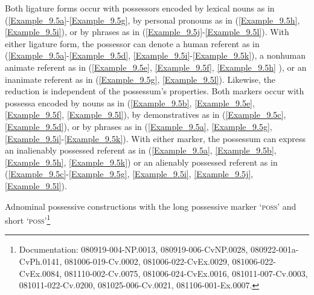 Both ligature forms occur with possessors encoded by lexical nouns as in (\ref{Example_9.5a}-\ref{Example_9.5g}, by personal pronouns as in (\ref{Example_9.5h}, \ref{Example_9.5i}), or by  phrases as in (\ref{Example_9.5j}-\ref{Example_9.5l}). With either ligature form, the possessor can denote a human referent as in (\ref{Example_9.5a}-\ref{Example_9.5d}, \ref{Example_9.5i}-\ref{Example_9.5k}), a nonhuman animate referent as in (\ref{Example_9.5e}, \ref{Example_9.5f}, \ref{Example_9.5h} ), or an inanimate referent as in (\ref{Example_9.5g}, \ref{Example_9.5l}). Likewise, the reduction is independent of the possessum’s properties. Both markers occur with possessa encoded by nouns as in (\ref{Example_9.5b}, \ref{Example_9.5e}, \ref{Example_9.5f}, \ref{Example_9.5l}), by demonstratives as in (\ref{Example_9.5c}, \ref{Example_9.5d}), or by  phrases as in (\ref{Example_9.5a}, \ref{Example_9.5g}, \ref{Example_9.5i}-\ref{Example_9.5k}). With either marker, the possessum can express an inalienably possessed referent as in (\ref{Example_9.5a}, \ref{Example_9.5b}, \ref{Example_9.5h}, \ref{Example_9.5k}) or an alienably possessed referent as in (\ref{Example_9.5c}-\ref{Example_9.5g}, \ref{Example_9.5i}, \ref{Example_9.5j}, \ref{Example_9.5l}).



\begin{styleExampleNumCard}
 Adnominal possessive constructions with the long possessive marker  ‘\textsc{poss}’ and short  ‘\textsc{poss}’\footnote{Documentation: 080919-004-NP.0013, 080919-006-CvNP.0028, 080922-001a-CvPh.0141, 081006-019-Cv.0002, 081006-022-CvEx.0029, 081006-022-CvEx.0084, 081110-002-Cv.0075, 081006-024-CvEx.0016, 081011-007-Cv.0003, 081011-022-Cv.0200, 081025-006-Cv.0021, 081106-001-Ex.0007.}\\
\end{styleExampleNumCard}

